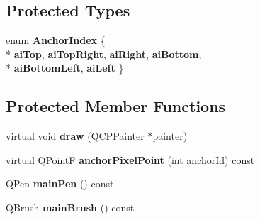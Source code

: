 \subsection*{Protected Types}
\begin{DoxyCompactItemize}
\item 
\hypertarget{classQCPItemRect_af0ebba58e6bca4851c4db726691ec0d3}{}enum {\bfseries Anchor\+Index} \{ \\*
{\bfseries ai\+Top}, 
{\bfseries ai\+Top\+Right}, 
{\bfseries ai\+Right}, 
{\bfseries ai\+Bottom}, 
\\*
{\bfseries ai\+Bottom\+Left}, 
{\bfseries ai\+Left}
 \}\label{classQCPItemRect_af0ebba58e6bca4851c4db726691ec0d3}

\end{DoxyCompactItemize}
\subsection*{Protected Member Functions}
\begin{DoxyCompactItemize}
\item 
\hypertarget{classQCPItemRect_a18cd583638b876cdd50f1a155ec182aa}{}virtual void {\bfseries draw} (\hyperlink{classQCPPainter}{Q\+C\+P\+Painter} $\ast$painter)\label{classQCPItemRect_a18cd583638b876cdd50f1a155ec182aa}

\item 
\hypertarget{classQCPItemRect_ae0973f8281fb52361b0c99ee899be07e}{}virtual Q\+Point\+F {\bfseries anchor\+Pixel\+Point} (int anchor\+Id) const \label{classQCPItemRect_ae0973f8281fb52361b0c99ee899be07e}

\item 
\hypertarget{classQCPItemRect_afa0fb7c6328a1e197ecd537de36daf8f}{}Q\+Pen {\bfseries main\+Pen} () const \label{classQCPItemRect_afa0fb7c6328a1e197ecd537de36daf8f}

\item 
\hypertarget{classQCPItemRect_ab0bd8e272e822ec851ba5b0c20e9200e}{}Q\+Brush {\bfseries main\+Brush} () const \label{classQCPItemRect_ab0bd8e272e822ec851ba5b0c20e9200e}

\end{DoxyCompactItemize}
